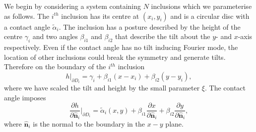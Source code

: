 We begin by considering a system containing $N$ inclusions which we parameterise as follows. The $i^{th}$ inclusion has its centre at $(x_i, y_i)$ and is a circular disc with a contact angle $\tilde{\alpha}_i$. The inclusion has a posture described by the height of the centre $\gamma_i$ and two angles $\beta_{i1}$ and $\beta_{i2}$ that describe the tilt about the $y$- and $x$-axis respectively. Even if the contact angle has no tilt inducing Fourier mode, the location of other inclusions could break the symmetry and generate tilts. Therefore on the boundary of the $i^{th}$ inclusion
\begin{equation}
    h\bigg\rvert_{\partial D_i} = \gamma_i + \beta_{i1}(x-x_i) + \beta_{i2}(y-y_i),
\end{equation}
where we have scaled the tilt and height by the small parameter $\xi$. The contact angle imposes
\begin{equation}
    \frac{\partial h}{\partial \hat{\mathbf{n}}_i}\bigg\rvert_{\partial D_i} = \tilde\alpha_i(x,y) + \beta_{i1}\frac{\partial x}{\partial \hat{\mathbf{n}}_i} + \beta_{i2}\frac{\partial y}{\partial \hat{\mathbf{n}}_i},
\end{equation}
where $\hat{\mathbf{n}}_i$ is the normal to the boundary in the $x-y$ plane. 

